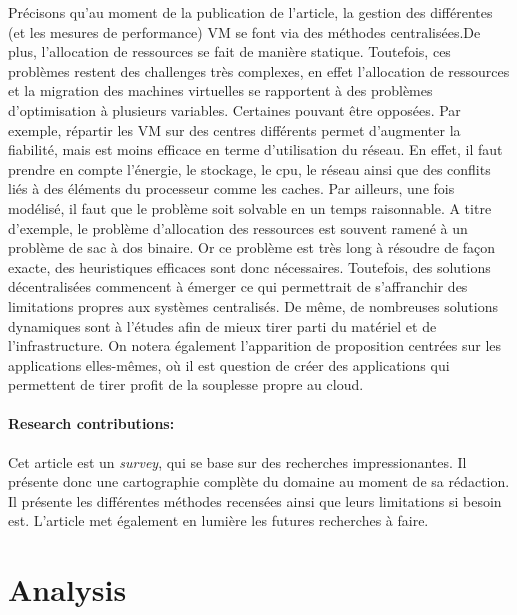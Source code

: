 \documentclass[11pt]{article}
\begin{document}
Précisons qu'au moment de la publication de l'article, la gestion des différentes (et les mesures de performance) VM se font via des méthodes
centralisées.De plus, l'allocation de ressources se fait de 
manière statique. Toutefois, ces problèmes restent des challenges très complexes, en effet l'allocation de ressources et la migration des machines virtuelles se rapportent
à des problèmes d'optimisation à plusieurs variables. Certaines pouvant être opposées. Par exemple, répartir les VM sur des centres différents permet d'augmenter la
fiabilité, mais est moins efficace en terme d'utilisation du réseau.
En effet, il faut prendre en compte l'énergie, le stockage, le cpu, le réseau 
ainsi que des conflits liés à des éléments du processeur comme les caches. Par ailleurs, une fois modélisé, il faut que le problème soit solvable en un temps raisonnable.
A titre d'exemple, le problème d'allocation des ressources est souvent ramené à un problème de sac à dos binaire. Or ce problème est très long à résoudre de façon exacte, 
des heuristiques efficaces sont donc nécessaires. Toutefois, des solutions décentralisées commencent à émerger ce qui permettrait de s'affranchir des limitations propres
aux systèmes centralisés. De même, de nombreuses solutions dynamiques sont à l'études afin de mieux tirer parti du matériel et de l'infrastructure.
On notera également l'apparition de proposition centrées sur les applications elles-mêmes, où il est question de créer des applications qui permettent de tirer profit de 
la souplesse propre au cloud.



\paragraph{Research contributions:} Cet article est un \textit{survey}, qui se base sur des recherches impressionantes. Il
présente donc une cartographie complète du domaine au moment de sa rédaction. Il présente les différentes méthodes recensées ainsi
que leurs limitations si besoin est. L'article met également en lumière les futures recherches à faire.

\section{Analysis}
\end{document}
